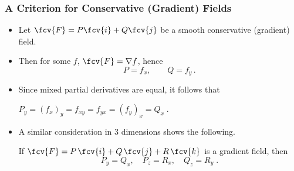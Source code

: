 \begin{frame}
\frametitle{A Criterion for Conservative (Gradient) Fields}
\begin{itemize}
\item Let $\fcv{F} = P \fcv{i} + Q\fcv{j}$ be a smooth conservative (gradient) field.
\item<2-> Then for some $f$, $\fcv{F} = \nabla f$, hence
\[
P= f_x, \qquad Q = f_y\, .
\]
\item<3->  Since mixed partial derivatives are equal, it follows that

\bigskip

\hfil $P_y = (f_x)_y = f_{xy} = f_{yx} = (f_y)_x = Q_x \; .
$
\item<5-> A similar consideration in 3 dimensions shows the following.
\begin{proposition}
If $\fcv{F} = P\, \fcv{i} + Q\, \fcv{j}+ R\, \fcv{k}$ is a gradient field, then
\[P_y = Q_x, \quad P_z = R_x, \quad Q_z=R_y\; .
\]
\end{proposition}
\end{itemize}

\end{frame}